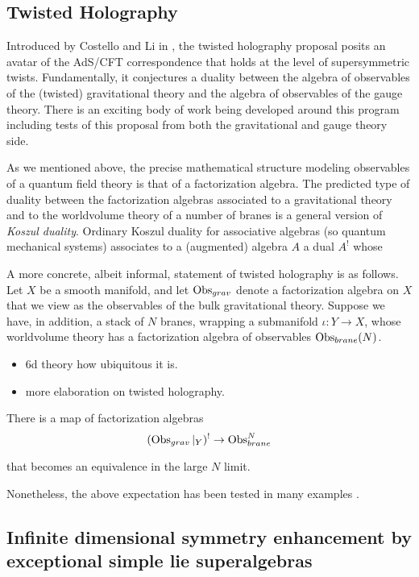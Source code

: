 \subsection{Twisted Holography}
Introduced by Costello and Li in \cite{CLsugra}, the twisted holography proposal posits an avatar of the AdS/CFT correspondence that holds at the level of supersymmetric twists. 
Fundamentally, it conjectures a duality between the algebra of observables of the (twisted) gravitational theory and the algebra of observables of the gauge theory.
There is an exciting body of work being developed around this program including tests of this proposal from both the gravitational and gauge theory side.

As we mentioned above, the precise mathematical structure modeling observables of a quantum field theory is that of a factorization algebra.
The predicted type of duality between the factorization algebras associated to a gravitational theory and to the worldvolume theory of a number of branes is a general version of \textit{Koszul duality}.
Ordinary Koszul duality for associative algebras (so quantum mechanical systems) associates to a (augmented) algebra $A$ a dual $A^!$ whose

A more concrete, albeit informal, statement of twisted holography is as follows. 
Let $X$ be a smooth manifold, and let $\operatorname{Obs}_{grav}$ denote a factorization algebra on $X$ that we view as the observables of the bulk gravitational theory. 
Suppose we have, in addition, a stack of $N$ branes, wrapping a submanifold $\iota \colon Y\to X$, whose worldvolume theory has a factorization algebra of observables $\operatorname{Obs}_{brane}(N)$.

\begin{itemize}
\item 6d theory how ubiquitous it is. 
\item more elaboration on twisted holography.
\end{itemize}


\begin{expect}
  There is a map of factorization algebras
  \[
        (\operatorname{Obs}_{grav}|_{Y})^{!}\to \operatorname{Obs}^{N}_{brane}
  \]

      that becomes an equivalence in the large $N$ limit.
\end{expect}



Nonetheless, the above expectation has been tested in many examples \cite{}.


\subsection{Infinite dimensional symmetry enhancement by exceptional simple lie superalgebras}

